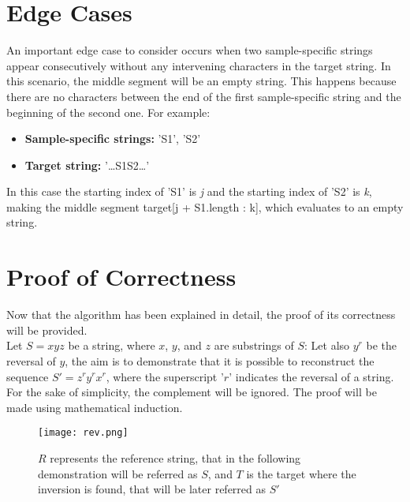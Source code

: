 \section{Edge Cases}
An important edge case to consider occurs when two sample-specific strings appear consecutively without any intervening characters in the target string. In this scenario, the middle segment will be an empty string. This happens because there are no characters between the end of the first sample-specific string and the beginning of the second one. For example:
\begin{itemize}
    \item \textbf{Sample-specific strings: } 'S1', 'S2'
    \item \textbf{Target string: }  '\dots S1S2\dots'
\end{itemize}

In this case the starting index of 'S1' is \textit{j} and the starting index of 'S2' is \textit{k}, making the middle segment target[j + S1.length : k], which evaluates to an empty string.

\section{Proof of Correctness}

Now that the algorithm has been explained in detail, the proof of its correctness will be provided. \\
Let \( S = xyz \) be a string, where \( x \), \( y \), and \( z \) are substrings of \( S \): Let also \(y^r \) be the reversal of \( y \), the aim is to demonstrate that it is possible to reconstruct the sequence \( S' = z^r y^r x^r \), where the superscript '\( r \)' indicates the reversal of a string. For the sake of simplicity, the complement will be ignored. The proof will be made using mathematical induction. 

\begin{figure}[h]

  \centering
    \texttt{[image: rev.png]}

  \caption{\( R \) represents the reference string, that in the following demonstration will be referred as \( S \), and \( T \) is the target where the inversion is found, that will be later referred as \( S' \)}
  \label{fig:rev}

\end{figure}

